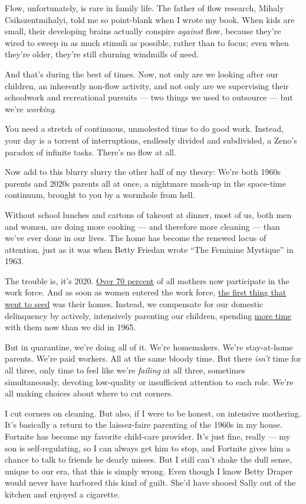 Flow, unfortunately, is rare in family life. The father of flow
research, Mihaly Csikszentmihalyi, told me so point-blank when I wrote
my book. When kids are small, their developing brains actually conspire
\emph{against} flow, because they're wired to sweep in as much stimuli
as possible, rather than to focus; even when they're older, they're
still churning windmills of need.

And that's during the best of times. Now, not only are we looking after
our children, an inherently non-flow activity, and not only are we
supervising their schoolwork and recreational pursuits --- two things we
used to outsource --- but we're \emph{working}.

You need a stretch of continuous, unmolested time to do good work.
Instead, your day is a torrent of interruptions, endlessly divided and
subdivided, a Zeno's paradox of infinite tasks. There's no flow at all.

Now add to this blurry slurry the other half of my theory: We're both
1960s parents and 2020s parents all at once, a nightmare mash-up in the
space-time continuum, brought to you by a wormhole from hell.

Without school lunches and cartons of takeout at dinner, most of us,
both men and women, are doing more cooking --- and therefore more
cleaning --- than we've ever done in our lives. The home has become the
renewed locus of attention, just as it was when Betty Friedan wrote
``The Feminine Mystique'' in 1963.

The trouble is, it's 2020.
\href{https://www.bls.gov/news.release/pdf/famee.pdf}{Over 70 percent}
of all mothers now participate in the work force. And as soon as women
entered the work force,
\href{https://www.pewsocialtrends.org/2013/03/14/chapter-5-americans-time-at-paid-work-housework-child-care-1965-to-2011/}{the
first thing that went to seed} was their homes. Instead, we compensate
for our domestic delinquency by actively, intensively parenting our
children, spending \href{https://nymag.com/news/features/67024/}{more
time} with them now than we did in 1965.

But in quarantine, we're doing all of it. We're homemakers. We're
stay-at-home parents. We're paid workers. All at the same bloody time.
But there \emph{isn't} time for all three, only time to feel like we're
\emph{failing} at all three, sometimes simultaneously, devoting
low-quality or insufficient attention to each role. We're all making
choices about where to cut corners.

I cut corners on cleaning. But also, if I were to be honest, on
intensive mothering. It's basically a return to the laissez-faire
parenting of the 1960s in my house. Fortnite has become my favorite
child-care provider. It's just fine, really --- my son is
self-regulating, so I can always get him to stop, and Fortnite gives him
a chance to talk to friends he dearly misses. But I still can't shake
the dull sense, unique to our era, that this is simply wrong. Even
though I know Betty Draper would never have harbored this kind of guilt.
She'd have shooed Sally out of the kitchen and enjoyed a cigarette.

